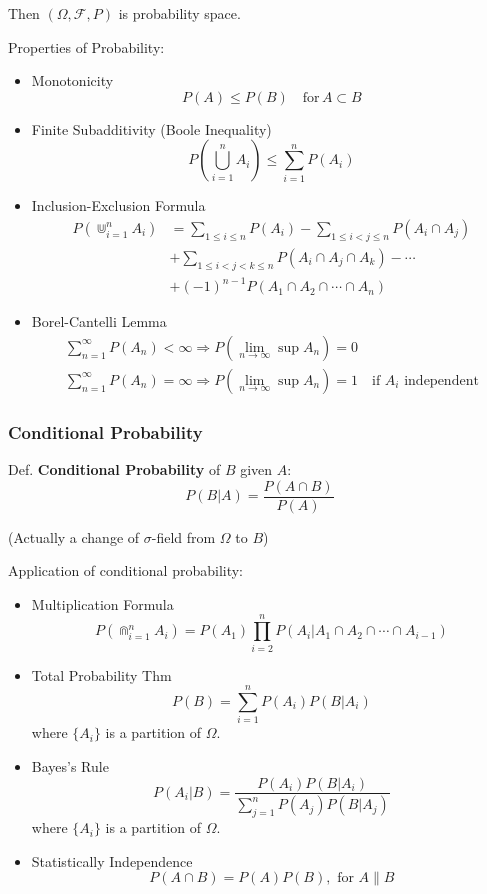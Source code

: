     Then $(\Omega,\mathscr{F},P)$ is probability space.

    Properties of Probability:
    \begin{itemize}
        \item Monotonicity
        \[
            P(A)\leq P(B)\quad \text{for}\, A\subset B
        \]
        \item Finite Subadditivity (Boole Inequality)
        \[
            P(\bigcup_{i=1}^nA_i)\leq\sum_{i=1}^n P(A_i)    
        \]
        \item Inclusion-Exclusion Formula
        \begin{align*}
            P(\Cup_{i=1}^nA_i)&=\sum_{1\leq i\leq n}P(A_i)-\sum_{1\leq i<j\leq n}P(A_i\cap A_j)\\
            &+\sum_{1\leq i<j<k\leq n}P(A_i\cap A_j\cap A_k)-\cdots\\
            &+(-1)^{n-1}P(A_1 \cap A_2\cap\cdots \cap A_n)
        \end{align*}
        \item Borel-Cantelli Lemma
        \begin{gather*}
            \sum_{n=1}^\infty P(A_n)<\infty\Rightarrow P(\lim_{n\to\infty}\sup A_n)=0\\
            \sum_{n=1}^\infty P(A_n)=\infty\Rightarrow P(\lim_{n\to\infty}\sup A_n)=1\quad \text{if }A_i\text{ independent}
        \end{gather*}
    \end{itemize}


\subsubsection{Conditional Probability}
        Def. \textbf{Conditional Probability} of $B$ given $A$:
        \[
            P(B|A)=\frac{P(A\cap B)}{P(A)}    
        \]

        (Actually a change of $\sigma$-field from $\Omega$ to $B$)

        Application of conditional probability:
        \begin{itemize}
        \item Multiplication Formula
        \[
            P(\Cap_{i=1}^n A_i)=P(A_1)\prod_{i=2}^n P(A_i|A_1\cap A_2\cap \cdots\cap A_{i-1})    
        \]
        \item Total Probability Thm
        \[
            P(B)=\sum_{i=1}^n P(A_i)P(B|A_i)  
        \]
        where $\{A_i\}$ is a partition of $\Omega$.
        \item Bayes's Rule
        \[
            P(A_i|B)=\frac{P(A_i)P(B|A_i)}{\sum_{j=1}^nP(A_j)P(B|A_j)}    
        \]
        where $\{A_i\}$ is a partition of $\Omega$.
        \item Statistically Independence
        \[
            P(A\cap B) =P(A)P(B),\text{ for }A\parallel B
        \]
    \end{itemize}


